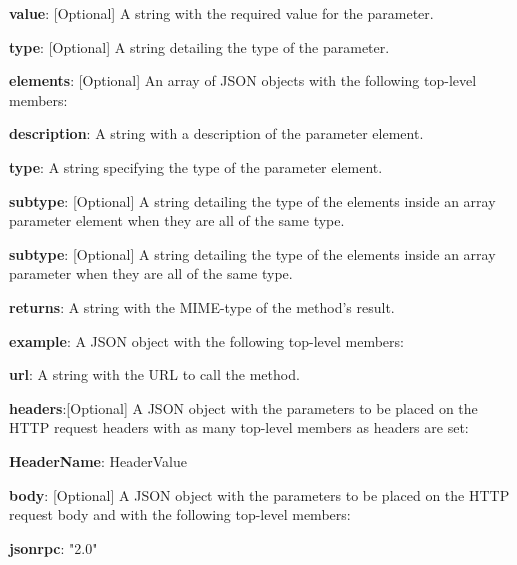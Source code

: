 \begin{myEnumerate}
\begin{myEnumerate}
\begin{myEnumerate}
\begin{myEnumerate}
                \item \textbf{value}: [Optional] A string with the required value for the parameter.
                \item \textbf{type}: [Optional] A string detailing the type of the parameter.
                \item \textbf{elements}: [Optional] An array of JSON objects with the following top-level members:
                \begin{myEnumerate}
                    \item \textbf{description}: A string with a description of the parameter element.
                    \item \textbf{type}: A string specifying the type of the parameter element.
                    \item \textbf{subtype}: [Optional] A string detailing the type of the elements inside an array parameter element when they are all of the same type.
                \end{myEnumerate}
                \item \textbf{subtype}: [Optional] A string detailing the type of the elements inside an array parameter when they are all of the same type.
            \end{myEnumerate}
            \item \textbf{returns}: A string with the MIME-type of the method's result.
            \item \textbf{example}: A JSON object with the following top-level members:
            \begin{myEnumerate}
                    \item \textbf{url}: A string with the URL to call the method.
                    \item \textbf{headers}:[Optional] A JSON object with the parameters to be placed on the HTTP request headers with as many top-level members as headers are set:
                    \begin{myEnumerate}
                        \item \textbf{HeaderName}: HeaderValue
                    \end{myEnumerate}
                    \item \textbf{body}: [Optional] A JSON object with the parameters to be placed on the HTTP request body and with the following top-level members:
                    \begin{myEnumerate}
                        \item \textbf{jsonrpc}: "2.0"

\end{myEnumerate}
\end{myEnumerate}
\end{myEnumerate}
\end{myEnumerate}
\end{myEnumerate}
